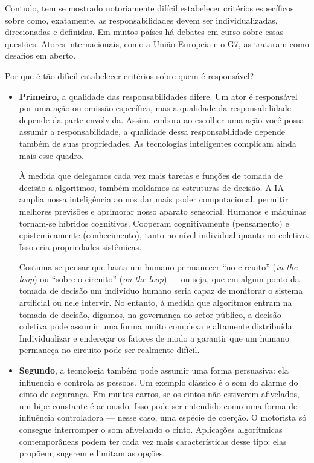 \documentclass[
  11pt,
]{article}
\begin{document}
Contudo, tem se mostrado notoriamente difícil estabelecer critérios
específicos sobre como, exatamente, as responsabilidades devem ser
individualizadas, direcionadas e definidas. Em muitos países há debates
em curso sobre essas questões. Atores internacionais, como a União
Europeia e o G7, as trataram como desafios em aberto.

Por que é tão difícil estabelecer critérios sobre quem é responsável?

\begin{itemize}
\item
  \textbf{Primeiro}, a qualidade das responsabilidades difere. Um ator é
  responsável por uma ação ou omissão específica, mas a qualidade da
  responsabilidade depende da parte envolvida. Assim, embora ao escolher
  uma ação você possa assumir a responsabilidade, a qualidade dessa
  responsabilidade depende também de suas propriedades. As tecnologias
  inteligentes complicam ainda mais esse quadro.

  À medida que delegamos cada vez mais tarefas e funções de tomada de
  decisão a algoritmos, também moldamos as estruturas de decisão. A IA
  amplia nossa inteligência ao nos dar mais poder computacional,
  permitir melhores previsões e aprimorar nosso aparato sensorial.
  Humanos e máquinas tornam-se híbridos cognitivos. Cooperam
  cognitivamente (pensamento) e epistemicamente (conhecimento), tanto no
  nível individual quanto no coletivo. Isso cria propriedades
  sistêmicas.

  Costuma-se pensar que basta um humano permanecer ``no circuito''
  (\emph{in-the-loop}) ou ``sobre o circuito'' (\emph{on-the-loop}) ---
  ou seja, que em algum ponto da tomada de decisão um indivíduo humano
  seria capaz de monitorar o sistema artificial ou nele intervir. No
  entanto, à medida que algoritmos entram na tomada de decisão, digamos,
  na governança do setor público, a decisão coletiva pode assumir uma
  forma muito complexa e altamente distribuída. Individualizar e
  endereçar os fatores de modo a garantir que um humano permaneça no
  circuito pode ser realmente difícil.
\item
  \textbf{Segundo}, a tecnologia também pode assumir uma forma
  persuasiva: ela influencia e controla as pessoas. Um exemplo clássico
  é o som do alarme do cinto de segurança. Em muitos carros, se os
  cintos não estiverem afivelados, um bipe constante é acionado. Isso
  pode ser entendido como uma forma de influência controladora --- nesse
  caso, uma espécie de coerção. O motorista só consegue interromper o
  som afivelando o cinto. Aplicações algorítmicas contemporâneas podem
  ter cada vez mais características desse tipo: elas propõem, sugerem e
  limitam as opções.


\end{itemize}
\end{document}
